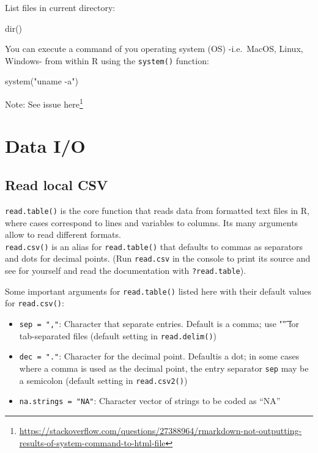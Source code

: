 \documentclass[
]{book}
\newenvironment{Shaded}{\begin{snugshade}}{\end{snugshade}}
\newcommand{\FunctionTok}[1]{\textcolor[rgb]{0.00,0.00,0.00}{#1}}
\newcommand{\NormalTok}[1]{#1}
\newcommand{\StringTok}[1]{\textcolor[rgb]{0.31,0.60,0.02}{#1}}
\providecommand{\tightlist}{%
  \setlength{\itemsep}{0pt}\setlength{\parskip}{0pt}}
\renewcommand{\href}[2]{#2\footnote{\url{#1}}}
\begin{document}
List files in current directory:

\begin{Shaded}
\begin{Highlighting}[]
\FunctionTok{dir}\NormalTok{()}
\end{Highlighting}
\end{Shaded}

You can execute a command of you operating system (OS) -i.e.~MacOS, Linux, Windows- from within R using the \texttt{system()} function:

\begin{Shaded}
\begin{Highlighting}[]
\FunctionTok{system}\NormalTok{(}\StringTok{"uname {-}a"}\NormalTok{)}
\end{Highlighting}
\end{Shaded}

Note: See issue \href{https://stackoverflow.com/questions/27388964/rmarkdown-not-outputting-results-of-system-command-to-html-file}{here}

\hypertarget{data-io}{%
\section{Data I/O}\label{data-io}}

\hypertarget{read-local-csv}{%
\subsection{Read local CSV}\label{read-local-csv}}

\texttt{read.table()} is the core function that reads data from formatted text files in R, where cases correspond to lines and variables to columns. Its many arguments allow to read different formats.\\
\texttt{read.csv()} is an alias for \texttt{read.table()} that defaults to commas as separators and dots for decimal points. (Run \texttt{read.csv} in the console to print its source and see for yourself and read the documentation with \texttt{?read.table}).

Some important arguments for \texttt{read.table()} listed here with their default values for \texttt{read.csv()}:

\begin{itemize}
\tightlist
\item
  \texttt{sep\ =\ ","}: Character that separate entries. Default is a comma; use "\t" for tab-separated files (default setting in \texttt{read.delim()})
\item
  \texttt{dec\ =\ "."}: Character for the decimal point. Defaultis a dot; in some cases where a comma is used as the decimal point, the entry separator \texttt{sep} may be a semicolon (default setting in \texttt{read.csv2()})
\item
  \texttt{na.strings\ =\ "NA"}: Character vector of strings to be coded as ``NA''
\end{itemize}
\end{document}
